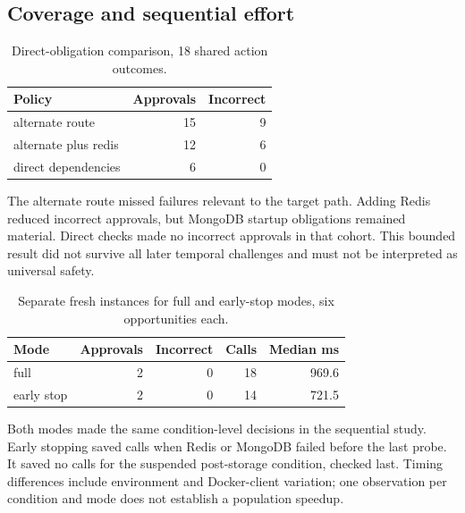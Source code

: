 \documentclass[manuscript,review,nonacm]{acmart}
\begin{document}
\subsection{Coverage and sequential effort}
\begin{table}[t]
\caption{Direct-obligation comparison, 18 shared action outcomes.}
\label{tab:policy-3-3}
\centering
\begin{tabularx}{\linewidth}{@{}Xrr@{}}
\toprule
Policy & Approvals & Incorrect \\
\midrule
alternate route & 15 & 9 \\
alternate plus redis & 12 & 6 \\
direct dependencies & 6 & 0 \\
\bottomrule
\end{tabularx}
\end{table}
The alternate route missed failures relevant to the target path. Adding Redis reduced incorrect approvals, but MongoDB startup obligations remained material. Direct checks made no incorrect approvals in that cohort. This bounded result did not survive all later temporal challenges and must not be interpreted as universal safety.

\begin{table}[t]
\caption{Separate fresh instances for full and early-stop modes, six opportunities each.}
\label{tab:mode-2-5}
\centering
\begin{tabularx}{\linewidth}{@{}Xrrrr@{}}
\toprule
Mode & Approvals & Incorrect & Calls & Median ms \\
\midrule
full & 2 & 0 & 18 & 969.6 \\
early stop & 2 & 0 & 14 & 721.5 \\
\bottomrule
\end{tabularx}
\end{table}
Both modes made the same condition-level decisions in the sequential study. Early stopping saved calls when Redis or MongoDB failed before the last probe. It saved no calls for the suspended post-storage condition, checked last. Timing differences include environment and Docker-client variation; one observation per condition and mode does not establish a population speedup.
\end{document}

